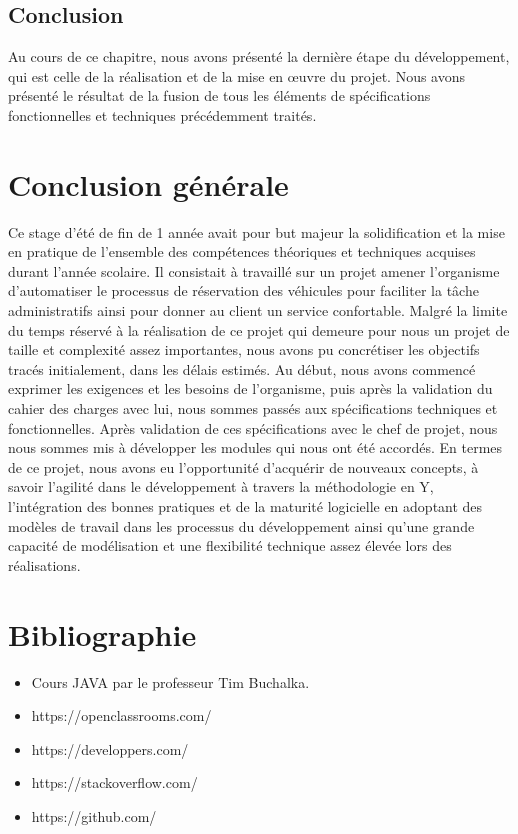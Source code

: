 \documentclass[12pt,a4paper]{report}
\begin{document}
	\section{Conclusion}
Au cours de ce chapitre, nous avons présenté la dernière étape du développement, qui est
celle de la réalisation et de la mise en œuvre du projet. Nous avons présenté le résultat de la fusion
de tous les éléments de spécifications fonctionnelles et techniques précédemment traités.





		\chapter*{Conclusion générale} 
	Ce stage d’été de fin de 1 année avait pour but majeur la solidification et la mise en
pratique de l’ensemble des compétences théoriques et techniques acquises durant l’année scolaire. Il
consistait à travaillé sur un projet amener l’organisme d’automatiser le processus de réservation des véhicules pour faciliter
la tâche administratifs ainsi pour donner au client un service confortable.
Malgré la limite du temps réservé à la réalisation de ce projet qui demeure pour nous un projet
de taille et complexité assez importantes, nous avons pu concrétiser les objectifs tracés initialement,
dans les délais estimés. Au début, nous avons commencé exprimer les exigences et les besoins de
l’organisme, puis après la validation du cahier des charges avec lui, nous sommes passés aux
spécifications techniques et fonctionnelles. Après validation de ces spécifications avec le chef de
projet, nous nous sommes mis à développer les modules qui nous ont été accordés.
En termes de ce projet, nous avons eu l’opportunité d’acquérir de nouveaux concepts, à savoir
l’agilité dans le développement à travers la méthodologie en Y, l’intégration des bonnes pratiques et
de la maturité logicielle en adoptant des modèles de travail dans les processus du développement ainsi
qu’une grande capacité de modélisation et une flexibilité technique assez élevée lors des réalisations.
	
	\chapter*{Bibliographie}
	
	\vspace{2cm}
	  \begin{itemize}
	 		\item Cours JAVA par le professeur Tim Buchalka.
			\item https://openclassrooms.com/
			\item https://developpers.com/
			\item https://stackoverflow.com/
			\item https://github.com/
		\end{itemize}
	
\end{document}
